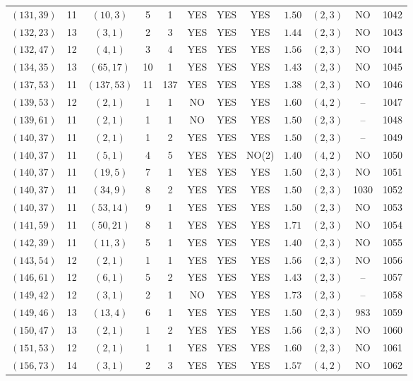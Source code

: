 \begin{longtable}{|c|c|c|c|c|c|c|c|c|c|c|c|}
$(131,39)$ & 11 & $(10,3)$ & 5 & 1 & YES & YES & YES & $1.50$ & $(2,3)$ & NO & 1042\\
$(132,23)$ & 13 & $(3,1)$ & 2 & 3 & YES & YES & YES & $1.44$ & $(2,3)$ & NO & 1043\\
$(132,47)$ & 12 & $(4,1)$ & 3 & 4 & YES & YES & YES & $1.56$ & $(2,3)$ & NO & 1044\\
$(134,35)$ & 13 & $(65,17)$ & 10 & 1 & YES & YES & YES & $1.43$ & $(2,3)$ & NO & 1045\\
$(137,53)$ & 11 & $(137,53)$ & 11 & 137 & YES & YES & YES & $1.38$ & $(2,3)$ & NO & 1046\\
$(139,53)$ & 12 & $(2,1)$ & 1 & 1 & NO & YES & YES & $1.60$ & $(4,2)$ & -- & 1047\\
$(139,61)$ & 11 & $(2,1)$ & 1 & 1 & NO & YES & YES & $1.50$ & $(2,3)$ & -- & 1048\\
$(140,37)$ & 11 & $(2,1)$ & 1 & 2 & YES & YES & YES & $1.50$ & $(2,3)$ & -- & 1049\\
$(140,37)$ & 11 & $(5,1)$ & 4 & 5 & YES & YES & NO(2) & $1.40$ & $(4,2)$ & NO & 1050\\
$(140,37)$ & 11 & $(19,5)$ & 7 & 1 & YES & YES & YES & $1.50$ & $(2,3)$ & NO & 1051\\
$(140,37)$ & 11 & $(34,9)$ & 8 & 2 & YES & YES & YES & $1.50$ & $(2,3)$ & 1030 & 1052\\
$(140,37)$ & 11 & $(53,14)$ & 9 & 1 & YES & YES & YES & $1.50$ & $(2,3)$ & NO & 1053\\
$(141,59)$ & 11 & $(50,21)$ & 8 & 1 & YES & YES & YES & $1.71$ & $(2,3)$ & NO & 1054\\
$(142,39)$ & 11 & $(11,3)$ & 5 & 1 & YES & YES & YES & $1.40$ & $(2,3)$ & NO & 1055\\
$(143,54)$ & 12 & $(2,1)$ & 1 & 1 & YES & YES & YES & $1.56$ & $(2,3)$ & NO & 1056\\
$(146,61)$ & 12 & $(6,1)$ & 5 & 2 & YES & YES & YES & $1.43$ & $(2,3)$ & -- & 1057\\
$(149,42)$ & 12 & $(3,1)$ & 2 & 1 & NO & YES & YES & $1.73$ & $(2,3)$ & -- & 1058\\
$(149,46)$ & 13 & $(13,4)$ & 6 & 1 & YES & YES & YES & $1.50$ & $(2,3)$ & 983 & 1059\\
$(150,47)$ & 13 & $(2,1)$ & 1 & 2 & YES & YES & YES & $1.56$ & $(2,3)$ & NO & 1060\\
$(151,53)$ & 12 & $(2,1)$ & 1 & 1 & YES & YES & YES & $1.60$ & $(2,3)$ & NO & 1061\\
$(156,73)$ & 14 & $(3,1)$ & 2 & 3 & YES & YES & YES & $1.57$ & $(4,2)$ & NO & 1062\\

\end{longtable}
